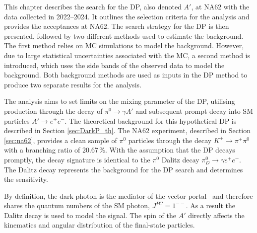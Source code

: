 \documentclass[../../main.tex]{subfiles}
\begin{document}
    \glsresetall
    This chapter describes the search for the \gls{DP}, also denoted $A'$, at NA62 with the data collected in 2022--2024. It outlines the selection criteria for the analysis and provides the acceptances at NA62. The search strategy for the \gls{DP} is then presented, followed by two different methods used to estimate the background. The first method relies 
    on \gls{MC} simulations to model the background. However, due to large statistical uncertainties associated with the \gls{MC}, a second method is introduced, which uses the side bands of the observed data to model the background. Both background methods are used as inputs in the \gls{DP} method to produce two separate results for the analysis.


    The analysis aims to set limits on the mixing parameter of the \gls{DP}, utilising production through the decay of $\pi^0 \to \gamma A'$ and subsequent prompt decay into \gls{SM} particles $A' \to e^+e^-$. The theoretical background for this hypothetical \gls{DP} is described in Section \ref{sec:DarkP_th}. 
    The NA62 experiment, described in Section \ref{sec:na62}, provides a clean sample of $\pi^0$ particles through the decay \mbox{$K^+ \to \pi^+\pi^0$} with a branching ratio of 20.67\,\%. With the assumption that the \gls{DP} decays promptly, the decay signature is identical to the $\pi^0$ Dalitz decay 
    $\pi^0_D \to \gamma e^+e^-$. The Dalitz decay represents the background for the \gls{DP} search and determines the sensitivity. 

    By definition, the dark photon is the mediator of the vector portal~\cite{Beacham_2020} and therefore shares the quantum numbers of the \gls{SM} photon, $J^{PC} = 1^{--}$. As a result the Dalitz decay is used to model the signal.
    The spin of the $A'$ directly affects the kinematics and angular distribution of the final-state particles.
    


\end{document}
